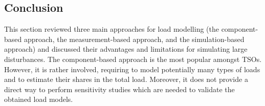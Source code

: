 



\subsection{Conclusion}
\label{sec:distrib_review_conclusion}

This section reviewed three main approaches for load modelling (the component-based approach, the measurement-based approach, and the simulation-based approach) and discussed their advantages and limitations for simulating large disturbances. The component-based approach is the most popular amongst TSOs. However, it is rather involved, requiring to model potentially many types of loads and to estimate their shares in the total load. Moreover, it does not provide a direct way to perform sensitivity studies which are needed to validate the obtained load models.


